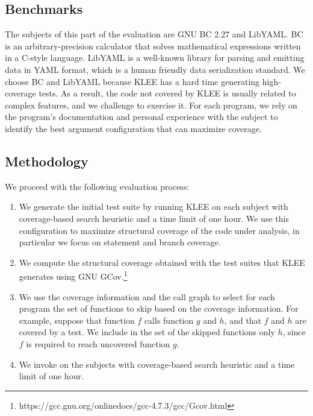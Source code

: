 \subsection{Benchmarks}
The subjects of this part of the evaluation are
GNU \textsf{BC} 2.27 and \textsf{LibYAML}. \textsf{BC} is an
arbitrary-precision calculator that solves mathematical expressions
written in a C-style language.  \textsf{LibYAML} is a well-known
library for parsing and emitting data in YAML format, which is a human
friendly data serialization standard.  We choose \textsf{BC} and
\textsf{LibYAML} because KLEE has a hard time generating high-coverage
tests. As a result, the code not covered by KLEE is usually related to
complex features, and we challenge \toolname to exercise it. For each
program, we rely on the program's documentation and personal
experience with the subject to identify the best argument
configuration that can maximize coverage.

\subsection{Methodology}
We proceed with the following evaluation process:

\begin{enumerate}[leftmargin=*]
\item We generate the initial test suite by running KLEE on each
  subject with coverage-based search heuristic and a time limit of one
  hour. We use this configuration to maximize structural coverage of
  the code under analysis, in particular we focus on statement and
  branch coverage.
\item We compute the structural coverage obtained with the test suites
  that KLEE generates using GNU
  GCov.\footnote{https://gcc.gnu.org/onlinedocs/gcc-4.7.3/gcc/Gcov.html}
\item We use the coverage information and the call graph to select for
  each program the set of functions to skip based on the coverage
  information. For example, suppose that function $f$ calls function
  $g$ and $h$, and that $f$ and $h$ are covered by a test. We include
  in the set of the skipped functions only $h$, since $f$ is required
  to reach uncovered function $g$.
\item We invoke \toolname on the subjects with coverage-based search
  heuristic and a time limit of one hour.
\end{enumerate}



